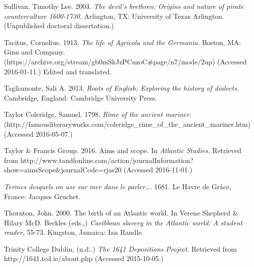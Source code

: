 \begin{styleStandard}
Sullivan, Timothy Lee. 2003. \textit{The devil’s brethren: Origins and nature of pirate counterculture 1600-1730. }Arlington, TX: University of Texas Arlington. (Unpublished doctoral dissertation.)
\end{styleStandard}

\begin{styleStandard}
Tacitus, Cornelius. 1913. \textit{The life of Agricola and the Germania}. Boston, MA: Ginn and Company. (https://archive.org/stream/gb0mSkJzPCuzoC\#page/n7/mode/2up) (Accessed 2016-01-11.) Edited and translated. 
\end{styleStandard}

\begin{styleStandard}
Tagliamonte, Sali A. 2013. \textit{Roots of English: Exploring the history of dialects}. Cambridge, England: Cambridge University Press.
\end{styleStandard}

\begin{styleStandard}
Taylor Coleridge, Samuel. 1798. \textit{Rime of the ancient mariner. }(http://famousliteraryworks.com/coleridge\_rime\_of\_the\_ancient\_mariner.htm) (Accessed 2016-05-07.)
\end{styleStandard}

\begin{styleStandard}
Taylor \& Francis Group. 2016. Aims and scope. In \textit{Atlantic Studies.} Retrieved from http://www.tandfonline.com/action/journalInformation?show=aimsScope\&journalCode=rjas20 (Accessed 2016-11-01.)
\end{styleStandard}

\begin{styleStandard}
\textit{Termes desquels on use sur mer dans le parler…. }1681. Le Havre de Grâce, France: Jacques Gruchet. 
\end{styleStandard}

\begin{styleStandard}
Thornton, John. 2000. The birth of an Atlantic world. In Verene Shepherd \& Hilary McD. Beckles (eds.,) \textit{Caribbean slavery in the Atlantic world: A student reader, }55-73. Kingston, Jamaica: Ian Randle.
\end{styleStandard}

\begin{styleStandard}
Trinity College Dublin, (n.d..) \textit{The 1641 Depositions Project}. Retrieved from http://1641.tcd.ie/about.php (Accessed 2015-10-05.)
\end{styleStandard}

